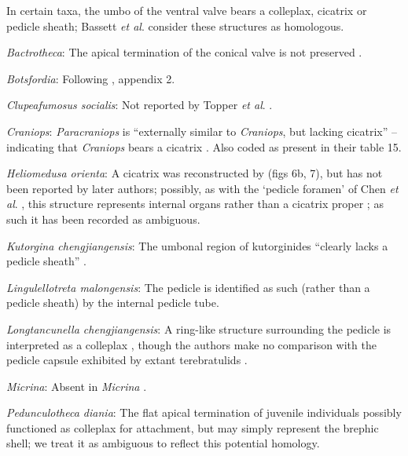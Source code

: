 \documentclass[openany]{book}
\begin{document}
In certain taxa, the umbo of the ventral valve bears a colleplax,
cicatrix or pedicle sheath; Bassett \emph{et al}.
\citeyearpar{Bassett2008Earlyontogeny} consider these structures as
homologous.

\hypertarget{Bactrotheca-coding-121}{}
\emph{Bactrotheca}: The apical termination of the conical valve is not
preserved \citep{Valent2012}.

\hypertarget{Botsfordia-coding-121}{}
\emph{Botsfordia}: Following \citet{Williams1998Thediversity}, appendix
2.

\hypertarget{Clupeafumosus_socialis-coding-121}{}
\emph{Clupeafumosus socialis}: Not reported by Topper \emph{et al}.
\citeyearpar{Topper2013Reappraisalof}.

\hypertarget{Craniops-coding-121}{}
\emph{Craniops}: \emph{Paracraniops} is ``externally similar to
\emph{Craniops}, but lacking cicatrix'' -- indicating that
\emph{Craniops} bears a cicatrix
\citep{Williams2000LinguliformeaCraniiformea}. Also coded as present in
their table 15.

\hypertarget{Heliomedusa_orienta-coding-121}{}
\emph{Heliomedusa orienta}: A cicatrix was reconstructed by
\citet{Jin1992Revisionof} (figs 6b, 7), but has not been reported by
later authors; possibly, as with the `pedicle foramen' of Chen \emph{et
al}. \citeyearpar{Chen2007Reinterpretationof}, this structure represents
internal organs rather than a cicatrix proper
\citep{Zhang2009Architectureand}; as such it has been recorded as
ambiguous.

\hypertarget{Kutorgina_chengjiangensis-coding-121}{}
\emph{Kutorgina chengjiangensis}: The umbonal region of kutorginides
``clearly lacks a pedicle sheath'' \citep{Holmer2018Theattachment}.

\hypertarget{Lingulellotreta_malongensis-coding-121}{}
\emph{Lingulellotreta malongensis}: The pedicle is identified as such
(rather than a pedicle sheath) by the internal pedicle tube.

\hypertarget{Longtancunella_chengjiangensis-coding-121}{}
\emph{Longtancunella chengjiangensis}: A ring-like structure surrounding
the pedicle is interpreted as a colleplax
\citep{Zhang2011Theexceptionally}, though the authors make no comparison
with the pedicle capsule exhibited by extant terebratulids
\citep[see][]{Holmer2018Evolutionarysignificance}.

\hypertarget{Micrina-coding-121}{}
\emph{Micrina}: Absent in \emph{Micrina} \citep{Holmer2011Firstrecord}.

\hypertarget{Pedunculotheca_diania-coding-121}{}
\emph{Pedunculotheca diania}: The flat apical termination of juvenile
individuals possibly functioned as colleplax for attachment, but may
simply represent the brephic shell; we treat it as ambiguous to reflect
this potential homology.
\end{document}

